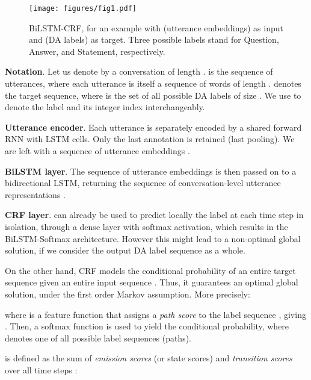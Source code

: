 \documentclass[11pt,a4paper]{article}
\begin{document}
\begin{figure}[t]
\centering
\texttt{[image: figures/fig1.pdf]}
\caption{
BiLSTM-CRF, for an example with  (utterance embeddings) as input and  (DA labels) as target. Three possible labels  stand for Question, Answer, and Statement, respectively.
}
\label{fig:BiLSTM-CRF}
\end{figure}

\noindent\textbf{Notation}.
Let us denote by  a conversation of length .   is the sequence of utterances, where each utterance  is itself a sequence of words of length .
 denotes the target sequence, where  is the set of all possible DA labels of size .
We use  to denote the label and its integer index interchangeably.

\noindent\textbf{Utterance encoder}.
Each utterance is separately encoded by a shared forward RNN with LSTM cells.
Only the last annotation  is retained (last pooling).
We are left with a sequence of utterance embeddings .


\noindent\textbf{BiLSTM layer}. 
The sequence of utterance embeddings  is then passed on to a bidirectional LSTM, returning the sequence of conversation-level utterance representations .

\noindent\textbf{CRF layer}.
 can already be used to predict locally the label at each time step in isolation, through a dense layer with softmax activation, which results in the BiLSTM-Softmax architecture.
However this might lead to a non-optimal global solution, if we consider the output DA label sequence as a whole.

On the other hand, CRF models the conditional probability  of an entire target sequence  given an entire input sequence .
Thus, it guarantees an optimal global solution, under the first order Markov assumption.
More precisely:

{\small
\setlength{\abovedisplayskip}{-3pt}
\setlength{\belowdisplayskip}{3pt}

}

\noindent where  is a feature function that assigns a \textit{path score} to the label sequence , giving .
Then, a softmax function is used to yield the conditional probability, where  denotes one of all possible label sequences (paths).

 is defined as the sum of \textit{emission scores} (or state scores) and \textit{transition scores} over all time steps \citep{morris2006combining,chen2019transfer}:

{\small
\setlength{\abovedisplayskip}{-3pt}
\setlength{\belowdisplayskip}{3pt}

}
\end{document}
